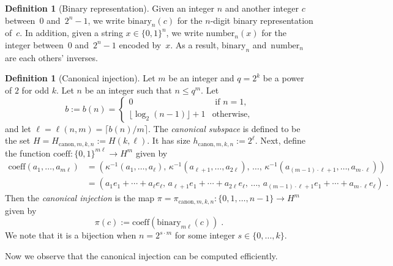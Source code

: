 \documentclass[11pt]{article}
\theoremstyle{definition}
\newtheorem{definition}[theorem]{Definition}
\newcommand{\downsize}{\kappa}
\newcommand{\binary}[1]{\mathrm{binary}_{#1}}
\newcommand{\num}[1]{\mathrm{number}_{#1}}
\newcommand{\canH}[3]{H_{\mathrm{canon}, #1, #2, #3}}
\newcommand{\canlilh}[3]{h_{\mathrm{canon}, #1, #2, #3}}
\newcommand{\canin}[3]{\pi_{\mathrm{canon},#1,#2,#3}}
\begin{document}
\begin{definition}[Binary representation]\label{def:binary-representation}
  Given an integer $n$ and another integer $c$ between~$0$ and~$2^n-1$, we write
  $\binary{n}(c)$ for the $n$-digit binary representation of~$c$.
  In addition, given a string $x \in \{0, 1\}^n$,
  we write $\num{n}(x)$ for the integer between~$0$ and~$2^n-1$ encoded by~$x$.
  As a result, $\binary{n}$ and~$\num{n}$ are each others' inverses.
\end{definition}

\begin{definition}[Canonical injection]
  \label{def:canonical-injection}
  Let $m$ be an integer and $q = 2^k$ be a power of $2$ for odd $k$.
  Let $n$ be an integer such that $n \le q^m$.
  Let
  \begin{equation*}
    b := b(n) =
    \begin{cases}
      0 & \text{ if } n = 1,\\
      \lfloor\log_2(n-1)\rfloor + 1 & \text{otherwise},
    \end{cases}
  \end{equation*}
  and let $\ell = \ell(n,m) = \lceil{b(n)/m\rceil}$.
  The \emph{canonical subspace} is defined to be the set $H = \canH{m}{k}{n} :=
  H(k, \ell)$.
  It has size $\canlilh{m}{k}{n} := 2^\ell$.
  Next, define the function $\mathrm{coeff}:\{0, 1\}^{m \ell} \rightarrow H^m$
  given by
  \begin{align*}
    \mathrm{coeff}(a_1, \ldots, a_{m \ell})
    & = (\downsize^{-1}(a_1, \ldots, a_\ell),\,
      \downsize^{-1}(a_{\ell+1}, \ldots, a_{2\ell}),\, \ldots,\,
      \downsize^{-1}(a_{(m-1)\cdot \ell +1}, \ldots, a_{m \cdot \ell}))\\
    & = (a_1 e_1 + \cdots + a_\ell e_\ell,\,
      a_{\ell+1} e_1 + \cdots + a_{2\ell} e_\ell,\, \ldots,\,
      a_{(m-1)\cdot \ell + 1} e_1 + \cdots + a_{m \cdot \ell} e_{\ell})\;.
  \end{align*}
  Then the \emph{canonical injection} is the map $\pi= \canin{m}{k}{n}:\{0, 1,
  \ldots, n-1\} \rightarrow H^m$ given by
  \begin{equation*}
    \pi(c) := \mathrm{coeff}(\binary{m\ell}(c))\;.
  \end{equation*}
  We note that it is a bijection when $n = 2^{s \cdot m}$ for some integer $s
  \in \{0, \ldots, k\}$.
\end{definition}

Now we observe that the canonical injection can be computed efficiently.
\end{document}
